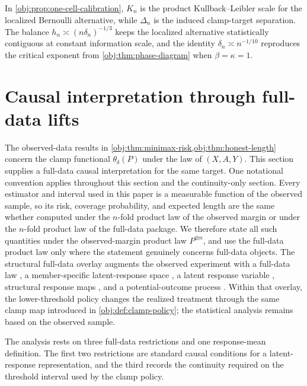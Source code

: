 \documentclass[11pt]{article}
\begin{document}
In \cref{obj:prop:one-cell-calibration}, \(K_n\) is the product Kullback--Leibler scale for the localized Bernoulli alternative, while \(\Delta_n\) is the induced clamp-target separation. The balance \(h_n\asymp(n\delta_n)^{-1/3}\) keeps the localized alternative statistically contiguous at constant information scale, and the identity \(\delta_n\asymp n^{-1/10}\) reproduces the critical exponent from \cref{obj:thm:phase-diagram} when \(\beta=\kappa=1\).


\section{Causal interpretation through full-data lifts}
\label{sec:causal-interpretation}

The observed-data results in \cref{obj:thm:minimax-risk,obj:thm:honest-length} concern the clamp functional \(\theta_\delta(P)\) under the law of \((X,A,Y)\). This section supplies a full-data causal interpretation for the same target.  One notational convention applies throughout this section and the continuity-only section.  Every estimator and interval used in this paper is a measurable function of the observed sample, so its risk, coverage probability, and expected length are the same whether computed under the \(n\)-fold product law of the observed margin or under the \(n\)-fold product law of the full-data package.  We therefore state all such quantities under the observed-margin product law \(P^{\otimes n}\), and use the full-data product law only where the statement genuinely concerns full-data objects. The structural full-data overlay augments the observed experiment with a full-data law , a member-specific latent-response space , a latent response variable , structural response maps , and a potential-outcome process . Within that overlay, the lower-threshold policy changes the realized treatment through the same clamp map introduced in \cref{obj:def:clamp-policy}; the statistical analysis remains based on the observed sample.

The analysis rests on three full-data restrictions and one response-mean definition. The first two restrictions are standard causal conditions for a latent-response representation, and the third records the continuity required on the threshold interval used by the clamp policy.
\end{document}
